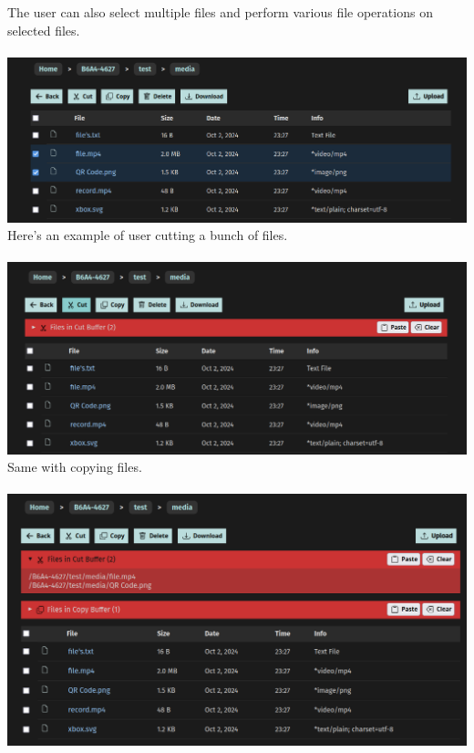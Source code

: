 \documentclass[12pt]{article}
\begin{document}
\clearpage
The user can also select multiple files and perform various file operations on selected files. \\ \\
\includegraphics[width=\linewidth]{ss/5.cm-select.png} \\

Here's an example of user cutting a bunch of files. \\ \\
\includegraphics[width=\linewidth]{ss/6.cm-cut.png} \\

\clearpage
Same with copying files. \\ \\
\includegraphics[width=\linewidth]{ss/7.cm-cut-copy.png} \\
\end{document}
